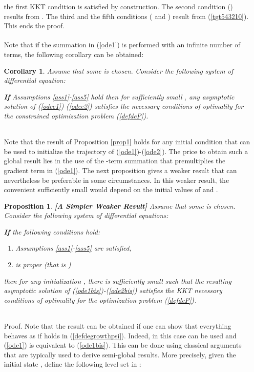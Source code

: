 \documentclass{article}
\newtheorem{corollary}{\bf Corollary}[section]
\newtheorem{proposition}{\bf Proposition}
\begin{document}
the first KKT condition is satisfied by construction. The second condition () results from . The third and the fifth conditions ( and ) result from (\ref{tgt543210}). This ends the proof.  
\ \\ \ \\ 
Note that if the summation in (\ref{ode1}) is performed with an infinite number of terms, the following corollary can be obtained:\\
\begin{corollary} \label{corollary1} 
Assume that some  is chosen. Consider the following system of differential equation:
 
{\bf If} Assumptions \ref{ass1}-\ref{ass5} hold then for sufficiently small , any asymptotic solution of (\ref{odee1})-(\ref{odee2}) satisfies the necessary conditions of optimality for the constrained optimization problem (\ref{defdeP}).      
\end{corollary}
\ \\
Note that the result of Proposition \ref{prop1} holds for any initial condition that can be used to initialize the trajectory of (\ref{ode1})-(\ref{ode2}). The price to obtain such a global result lies in the use of the -term summation  that premultiplies the gradient term  in (\ref{ode1}). The next proposition gives a weaker result that can nevertheless be preferable in some circumstances. In this weaker result, the convenient sufficiently small  would depend on the initial values of  and . \ \\ 
\begin{proposition}{\bf [A Simpler Weaker Result]} \label{prop2} 
Assume that some  is chosen. Consider the following system of differential equations:
 
{\bf If} the following conditions hold:
\begin{enumerate}
\item Assumptions \ref{ass1}-\ref{ass5} are satisfied,
\item  is proper (that is )
\end{enumerate}  
then for any initialization , there is sufficiently small  such that the resulting asymptotic solution of (\ref{ode1bis})-(\ref{ode2bis}) satisfies the KKT necessary conditions of optimality for the optimization problem (\ref{defdeP}).  
\end{proposition}
\ \\
{\sc Proof}. Note that the result  can be obtained if one can show that everything behaves as if  holds in (\ref{defdegrowthpsi}). Indeed, in this case  can be used and (\ref{ode1}) is equivalent to (\ref{ode1bis}). This can be done using classical arguments that are typically used to derive semi-global results. More precisely, given the initial state , define the following level set in :
\end{document}
